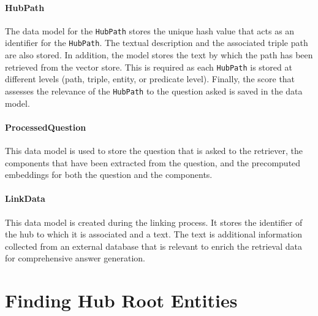 \paragraph{HubPath} The data model for the \texttt{HubPath} stores the unique hash value that acts as an identifier for the \texttt{HubPath}. The textual description and the associated triple path are also stored. In addition, the model stores the text by which the path has been retrieved from the vector store. This is required as each \texttt{HubPath} is stored at different levels (path, triple, entity, or predicate level). Finally, the score that assesses the relevance of the \texttt{HubPath} to the question asked is saved in the data model.

\paragraph{ProcessedQuestion} This data model is used to store the question that is asked to the retriever, the components that have been extracted from the question, and the precomputed embeddings for both the question and the components.

\paragraph{LinkData} This data model is created during the linking process. It stores the identifier of the hub to which it is associated and a text. The text is additional information collected from an external database that is relevant to enrich the retrieval data for comprehensive answer generation.


\section{Finding Hub Root Entities}
\label{sec:hublink_finding_hub_root_entities}

